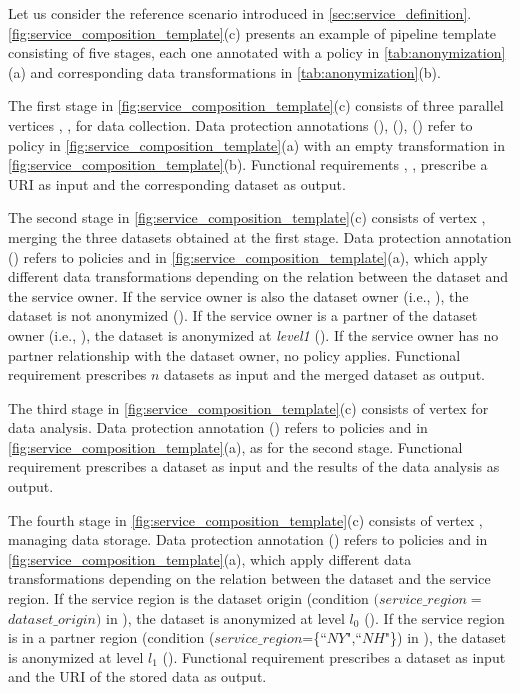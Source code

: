 \begin{example}[\bf \pipelineTemplate]\label{ex:template}
  Let us consider the reference scenario introduced in \cref{sec:service_definition}.
  {\color{OurColor}\cref{fig:service_composition_template}(c) presents an example of pipeline template consisting of five stages, each one annotated with a policy in \cref{tab:anonymization}(a) and corresponding data transformations in \cref{tab:anonymization}(b).}

  The first stage in \cref{fig:service_composition_template}(c) consists of three parallel vertices , ,  for data collection.
  Data protection annotations \myLambda(), \myLambda(), \myLambda() refer to policy  in \cref{fig:service_composition_template}(a) with an empty transformation  in \cref{fig:service_composition_template}(b).
  Functional requirements , ,   prescribe a URI as input and the corresponding dataset as output.

  The second stage in \cref{fig:service_composition_template}(c) consists of vertex , merging the three datasets obtained at the first stage. Data protection annotation \myLambda() refers to policies  and  in \cref{fig:service_composition_template}(a), which apply different data transformations depending on the relation between the dataset and the service owner.
  If the service owner is also the dataset owner (i.e., \pone), the dataset is not anonymized (). If the service owner is a partner of the dataset owner (i.e., \ptwo), the dataset is anonymized at \emph{level1} (). If the service owner has no partner relationship with the dataset owner, no policy applies.
  Functional requirement  prescribes $n$ datasets as input and the merged dataset as output.

  The third stage in \cref{fig:service_composition_template}(c) consists of vertex   for data analysis.
  Data protection annotation \myLambda() refers to policies  and  in \cref{fig:service_composition_template}(a), as for the second stage.
  Functional requirement  prescribes a dataset as input and the results of the data analysis as output.

  The fourth stage in \cref{fig:service_composition_template}(c) consists of vertex , managing data storage. Data protection annotation \myLambda() refers to policies  and  in \cref{fig:service_composition_template}(a), which apply different data transformations depending on the relation between the dataset and the service region.
  If the service region is the dataset origin (condition $(service\_region$$=$$dataset\_origin)$ in ), the dataset is anonymized at level $l_0$ ().
  If the service region is in a partner region (condition ($service\_region$=\{``$NY$",``$NH$"\}) in ), the dataset is anonymized at level $l_1$ ().
  Functional requirement  prescribes a dataset as input and the URI of the stored data as output.


\end{example}
